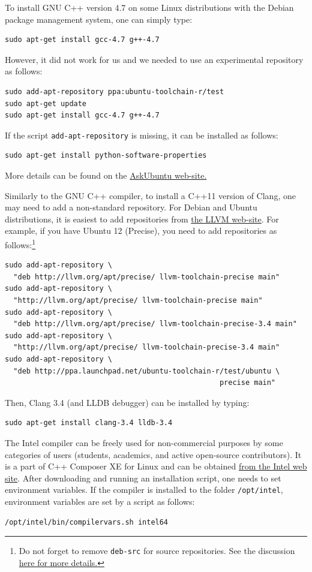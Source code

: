 \documentclass[runningheads,a4paper]{llncs}
\newcommand{\ttt}[1]{\texttt{#1}}
\begin{document}
{To install GNU C++ version 4.7 on some Linux distributions with the Debian package management system, 
one can simply type:
\begin{verbatim}
sudo apt-get install gcc-4.7 g++-4.7
\end{verbatim}
However, it did not work for us and we needed to use an experimental repository as follows:
\begin{verbatim}
sudo add-apt-repository ppa:ubuntu-toolchain-r/test
sudo apt-get update
sudo apt-get install gcc-4.7 g++-4.7
\end{verbatim}
If the script \ttt{add-apt-repository} is missing, it can be installed as follows:
\begin{verbatim}
sudo apt-get install python-software-properties
\end{verbatim}
More details can be found on the \href{http://askubuntu.com/questions/113291/how-do-i-install-gcc-4-7}{AskUbuntu web-site.}

Similarly to the GNU C++ compiler, to install a C++11 version of Clang, one may need to add a non-standard repository.
For Debian and Ubuntu distributions, it is easiest to add repositories from \href{http://llvm.org/apt/}{the LLVM web-site}. 
For example, if you have Ubuntu 12 (Precise), you need to add repositories
as follows:\footnote{Do not forget to remove \ttt{deb-src} for source repositories.
See the discussion \href{http://askubuntu.com/questions/160511/why-does-add-apt-repository-fail-to-add-source-repositories}{here for more details.}}
\begin{verbatim}
sudo add-apt-repository \
  "deb http://llvm.org/apt/precise/ llvm-toolchain-precise main"
sudo add-apt-repository \
  "http://llvm.org/apt/precise/ llvm-toolchain-precise main"
sudo add-apt-repository \
  "deb http://llvm.org/apt/precise/ llvm-toolchain-precise-3.4 main"
sudo add-apt-repository \
  "http://llvm.org/apt/precise/ llvm-toolchain-precise-3.4 main"
sudo add-apt-repository \
  "deb http://ppa.launchpad.net/ubuntu-toolchain-r/test/ubuntu \
                                                  precise main"
\end{verbatim}
Then, Clang 3.4 (and LLDB debugger) can be installed by typing:
\begin{verbatim}
sudo apt-get install clang-3.4 lldb-3.4
\end{verbatim}

The Intel compiler can be freely used for non-commercial purposes by some categories of users (students, academics,
and active open-source contributors).
It is a part of C++ Composer XE for Linux and can 
be obtained \href{http://software.intel.com/en-us/non-commercial-software-development}{from the Intel web site}.
After downloading and running an installation script, one needs to set environment variables.
If the compiler is installed to the folder \ttt{/opt/intel}, environment variables
are set by a script as follows:
\begin{verbatim}
/opt/intel/bin/compilervars.sh intel64
\end{verbatim}

}
\end{document}
